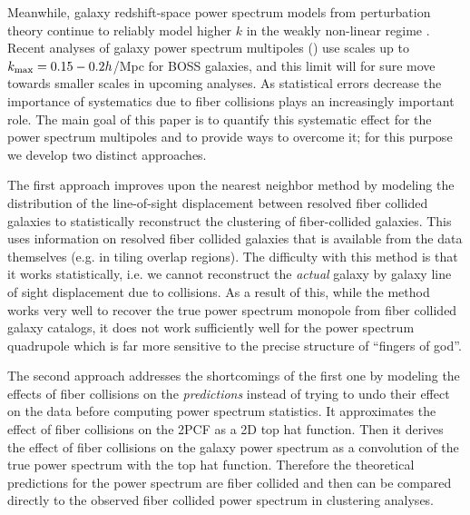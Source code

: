 
Meanwhile, galaxy redshift-space power spectrum models from perturbation theory continue to 
reliably model higher $k$ in the weakly non-linear regime
\citep{Taruya:2010aa, Taruya:2014aa, Okumura:2015aa, Beutler:2016aa, Grieb:2016aa, Sanchez:2016aa}.
Recent analyses of galaxy power spectrum 
multipoles (\citealt{Beutler:2014aa, Gil-Marin:2014aa, Gil-Marin:2016ab, Gil-Marin:2016aa, Beutler:2016aa, Grieb:2016aa}) use scales up to $k_{\rm max}=0.15-0.2 h$/Mpc for BOSS galaxies, and this limit will for sure move towards smaller scales in upcoming analyses. As statistical errors decrease the importance of systematics due to fiber collisions plays an increasingly important role. The main goal of this paper is to quantify this systematic effect for the power spectrum multipoles and to provide ways to overcome it; for this purpose we
develop two distinct approaches. 

The first approach improves upon the nearest neighbor method by modeling the 
distribution of the line-of-sight displacement between resolved fiber collided 
galaxies to statistically reconstruct the clustering of fiber-collided galaxies. 
This uses information on resolved fiber collided galaxies that is available from 
the data themselves (e.g. in tiling overlap regions). The difficulty with this 
method is that it works statistically, i.e. we cannot reconstruct the {\em actual} 
galaxy by galaxy line of sight displacement due to collisions. As a result of this, 
while the method works very well to recover the true power spectrum monopole 
from fiber collided galaxy catalogs, it does not work sufficiently well for the 
power spectrum quadrupole which is far more sensitive to the precise structure of ``fingers of god''. 

The second approach addresses the shortcomings of the first one by modeling the effects of fiber collisions on the {\em predictions} instead of trying to undo their effect on the data before computing power spectrum statistics. It approximates the effect of fiber collisions on the 2PCF as 
a 2D top hat function. Then it derives the effect of fiber collisions on the galaxy power spectrum as a 
convolution of the true power spectrum with the top hat function. Therefore the theoretical predictions for the power spectrum are fiber collided and then can be compared  directly to the observed fiber collided power spectrum in clustering analyses. 

